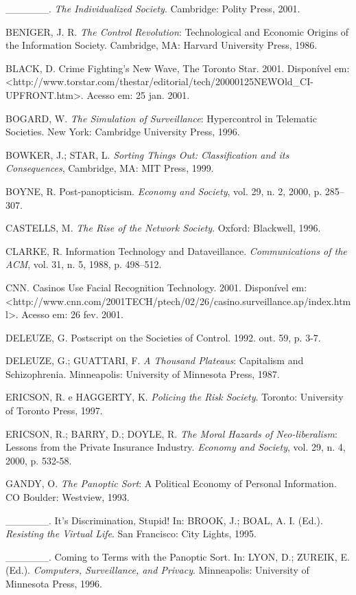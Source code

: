 \_\_\_\_\_\_. \emph{The Individualized Society}. Cambridge: Polity
Press, 2001.

BENIGER, J. R. \emph{The Control Revolution}: Technological and Economic
Origins of the Information Society. Cambridge, MA: Harvard University
Press, 1986.

BLACK, D. Crime Fighting's New Wave, The Toronto Star. 2001. Disponível
em:
\textless{}http://www.torstar.com/thestar/editorial/tech/20000125NEWOld\_CI-UPFRONT.htm\textgreater{}.
Acesso em: 25 jan. 2001.

BOGARD, W. \emph{The Simulation of Surveillance}: Hypercontrol in
Telematic Societies. New York: Cambridge University Press, 1996.

BOWKER, J.; STAR, L. \emph{Sorting Things Out: Classification and its
Consequences}, Cambridge, MA: MIT Press, 1999.

BOYNE, R. Post-panopticism. \emph{Economy and Society}, vol. 29, n. 2,
2000, p. 285--307.

CASTELLS, M. \emph{The Rise of the Network Society}. Oxford: Blackwell,
1996.

CLARKE, R. Information Technology and Dataveillance.
\emph{Communications of the ACM}, vol. 31, n. 5, 1988, p. 498--512.

CNN. Casinos Use Facial Recognition Technology. 2001. Disponível em:
\textless{}http://www.cnn.com/2001TECH/ptech/02/26/casino.surveillance.ap/index.html\textgreater{}.
Acesso em: 26 fev. 2001.

DELEUZE, G. Postscript on the Societies of Control. 1992. out. 59, p.
3-7.

DELEUZE, G.; GUATTARI, F. \emph{A Thousand Plateaus}: Capitalism and
Schizophrenia. Minneapolis: University of Minnesota Press, 1987.

ERICSON, R. e HAGGERTY, K. \emph{Policing the Risk Society}. Toronto:
University of Toronto Press, 1997.

ERICSON, R.; BARRY, D.; DOYLE, R. \emph{The Moral Hazards of
Neo-liberalism}: Lessons from the Private Insurance Industry.
\emph{Economy and Society}, vol. 29, n. 4, 2000, p. 532-58.

GANDY, O. \emph{The Panoptic Sort}: A Political Economy of Personal
Information. CO Boulder: Westview, 1993.

\_\_\_\_\_\_. It's Discrimination, Stupid! In: BROOK, J.; BOAL, A. I.
(Ed.). \emph{Resisting the Virtual Life}. San Francisco: City Lights,
1995.

\_\_\_\_\_\_. Coming to Terms with the Panoptic Sort. In: LYON, D.;
ZUREIK, E. (Ed.). \emph{Computers, Surveillance, and Privacy}.
Minneapolis: University of Minnesota Press, 1996.

